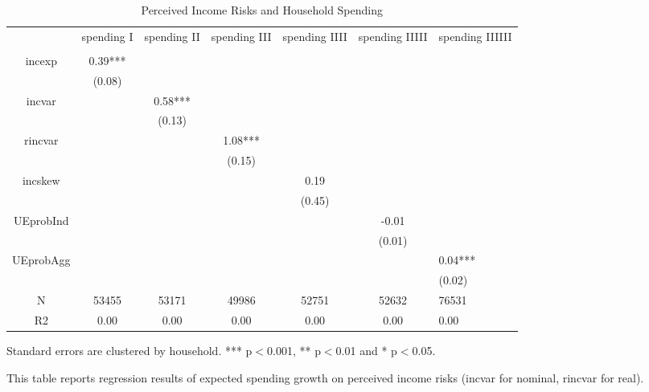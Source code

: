 
\begin{table}[p]
\centering
\begin{adjustbox}{width={0.9\textwidth}}
\begin{threeparttable}
\caption{Perceived Income Risks and Household Spending}
\label{spending_reg}\begin{tabular}{ccccccl}
\toprule
{} & spending I & spending II & spending III & spending IIII & spending IIIII & spending IIIIII \\
          &            &             &              &               &                &                 \\
\midrule
incexp    &    0.39*** &             &              &               &                &                 \\
          &     (0.08) &             &              &               &                &                 \\
incvar    &            &     0.58*** &              &               &                &                 \\
          &            &      (0.13) &              &               &                &                 \\
rincvar   &            &             &      1.08*** &               &                &                 \\
          &            &             &       (0.15) &               &                &                 \\
incskew   &            &             &              &          0.19 &                &                 \\
          &            &             &              &        (0.45) &                &                 \\
UEprobInd &            &             &              &               &          -0.01 &                 \\
          &            &             &              &               &         (0.01) &                 \\
UEprobAgg &            &             &              &               &                &         0.04*** \\
          &            &             &              &               &                &          (0.02) \\
N         &      53455 &       53171 &        49986 &         52751 &          52632 &           76531 \\
R2        &       0.00 &        0.00 &         0.00 &          0.00 &           0.00 &            0.00 \\
\bottomrule
\end{tabular}
\begin{tablenotes}\item Standard errors are clustered by household. *** p$<$0.001, ** p$<$0.01 and * p$<$0.05. 
\item This table reports regression results of expected spending growth on perceived income risks (incvar for nominal, rincvar for real).
\end{tablenotes}
\end{threeparttable}
\end{adjustbox}
\end{table}